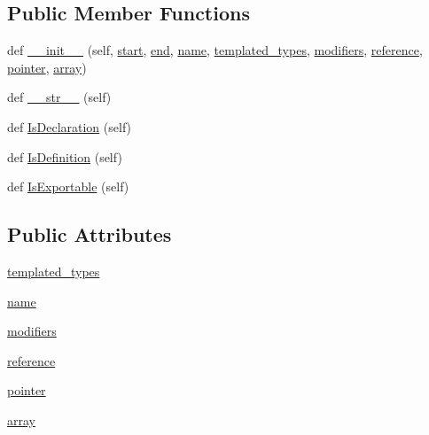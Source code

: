 \subsection*{Public Member Functions}
\begin{DoxyCompactItemize}
\item 
def \hyperlink{classcpp_1_1ast_1_1Type_adc20d88db721b5d7b513c08a4d6753c9}{\+\_\+\+\_\+init\+\_\+\+\_\+} (self, \hyperlink{classcpp_1_1ast_1_1Node_a7b2aa97e6a049bb1a93aea48c48f1f44}{start}, \hyperlink{classcpp_1_1ast_1_1Node_a3c5e5246ccf619df28eca02e29d69647}{end}, \hyperlink{classcpp_1_1ast_1_1Type_a5905424e2b65f0215b6ecd73b4bfe24c}{name}, \hyperlink{classcpp_1_1ast_1_1Type_a7c38fcafa00dae6ee22bab783086a1a7}{templated\+\_\+types}, \hyperlink{classcpp_1_1ast_1_1Type_a0effa0a077eda79943e881955b4c51a5}{modifiers}, \hyperlink{classcpp_1_1ast_1_1Type_a8d2cddd631397c3bf86198cc420d584d}{reference}, \hyperlink{classcpp_1_1ast_1_1Type_a37234bb68915c93894cbc8e366c1eaad}{pointer}, \hyperlink{classcpp_1_1ast_1_1Type_a1fd0493e82da315bcb4c02b0cf2133a3}{array})
\item 
def \hyperlink{classcpp_1_1ast_1_1Type_a1a10eff21f6150b7e14bde3788fa069b}{\+\_\+\+\_\+str\+\_\+\+\_\+} (self)
\item 
def \hyperlink{classcpp_1_1ast_1_1Type_a590071a2bce7ea5140d7eb86c90f63bf}{Is\+Declaration} (self)
\item 
def \hyperlink{classcpp_1_1ast_1_1Type_aedff25dc3736e83388742e55fe29159b}{Is\+Definition} (self)
\item 
def \hyperlink{classcpp_1_1ast_1_1Type_a80dce781581c03e550ce51a9a33ca158}{Is\+Exportable} (self)
\end{DoxyCompactItemize}
\subsection*{Public Attributes}
\begin{DoxyCompactItemize}
\item 
\hyperlink{classcpp_1_1ast_1_1Type_a7c38fcafa00dae6ee22bab783086a1a7}{templated\+\_\+types}
\item 
\hyperlink{classcpp_1_1ast_1_1Type_a5905424e2b65f0215b6ecd73b4bfe24c}{name}
\item 
\hyperlink{classcpp_1_1ast_1_1Type_a0effa0a077eda79943e881955b4c51a5}{modifiers}
\item 
\hyperlink{classcpp_1_1ast_1_1Type_a8d2cddd631397c3bf86198cc420d584d}{reference}
\item 
\hyperlink{classcpp_1_1ast_1_1Type_a37234bb68915c93894cbc8e366c1eaad}{pointer}
\item 
\hyperlink{classcpp_1_1ast_1_1Type_a1fd0493e82da315bcb4c02b0cf2133a3}{array}
\end{DoxyCompactItemize}


